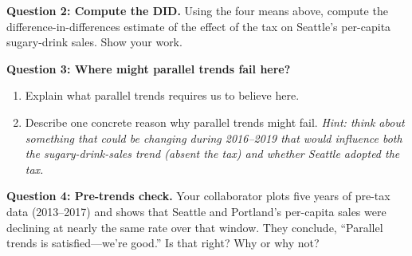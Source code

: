 \documentclass[11pt]{article}
\begin{document}
\vspace{6pt}

\noindent\textbf{Question 2: Compute the DID.}  Using the four means above, compute the difference-in-differences estimate of the effect of the tax on Seattle's per-capita sugary-drink sales.  Show your work.

\vspace{5cm}

\newpage

\noindent\textbf{Question 3: Where might parallel trends fail here?}

\medskip
\begin{enumerate}[label=(\alph*), itemsep=0em, topsep=0pt]
\item Explain what parallel trends requires us to believe here.

\vspace{3.5cm}

\item Describe one concrete reason why parallel trends might fail.  \textit{Hint: think about something that could be changing during 2016--2019 that would influence both the sugary-drink-sales trend (absent the tax) and whether Seattle adopted the tax.}

\vspace{6cm}
\end{enumerate}

\noindent\textbf{Question 4: Pre-trends check.}  Your collaborator plots five years of pre-tax data (2013--2017) and shows that Seattle and Portland's per-capita sales were declining at nearly the same rate over that window.  They conclude, ``Parallel trends is satisfied---we're good.''  Is that right? Why or why not?

\vspace{8cm}
\end{document}
